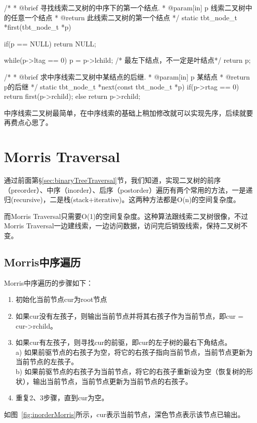 \begin{Codex}[label=theaded_binary_tree.c]
 /*
  * @brief 寻找线索二叉树的中序下的第一个结点.
  * @param[in] p 线索二叉树中的任意一个结点
  * @return 此线索二叉树的第一个结点
  */
static tbt_node_t *first(tbt_node_t *p) {
    if(p == NULL)  return NULL;

    while(p->ltag == 0) {
        p = p->lchild;  /* 最左下结点，不一定是叶结点*/
    }
    return p;
}

 /*
  * @brief 求中序线索二叉树中某结点的后继.
  * @param[in] p 某结点
  * @return p的后继
  */
static tbt_node_t *next(const tbt_node_t *p) {
    if(p->rtag == 0) {
        return first(p->rchild);
    } else {
        return p->rchild;
    }
}
\end{Codex}

中序线索二叉树最简单，在中序线索的基础上稍加修改就可以实现先序，后续就要再费点心思了。


\section{Morris Traversal} %
通过前面第\S \ref{sec:binaryTreeTraversal}节，我们知道，实现二叉树的前序（preorder）、中序（inorder）、后序（postorder）遍历有两个常用的方法，一是递归(recursive)，二是栈(stack+iterative)。这两种方法都是O(n)的空间复杂度。

而Morris Traversal只需要O(1)的空间复杂度。这种算法跟线索二叉树很像，不过Morris Traversal一边建线索，一边访问数据，访问完后销毁线索，保持二叉树不变。

\subsection{Morris中序遍历}
Morris中序遍历的步骤如下：
\begin{enumerate}
\item 初始化当前节点cur为root节点
\item 如果cur没有左孩子，则输出当前节点并将其右孩子作为当前节点，即cur = cur->rchild。
\item 如果cur有左孩子，则寻找cur的前驱，即cur的左子树的最右下角结点。\\
   a) 如果前驱节点的右孩子为空，将它的右孩子指向当前节点，当前节点更新为当前节点的左孩子。\\
   b) 如果前驱节点的右孩子为当前节点，将它的右孩子重新设为空（恢复树的形状），输出当前节点，当前节点更新为当前节点的右孩子。
\item 重复2、3步骤，直到cur为空。
\end{enumerate}
如图~\ref{fig:inorderMorris}所示，cur表示当前节点，深色节点表示该节点已输出。

